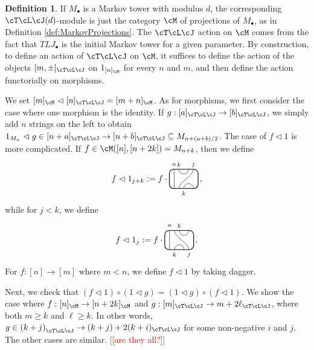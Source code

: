 \documentclass[11pt]{article}
\theoremstyle{plain}
\theoremstyle{definition}
\newtheorem{defn}[thm]{Definition}
\newcommand{\nn}[1]{\textcolor{red}{[[#1]]}}
\newcommand{\TLJ}{\cT\cL\cJ}
\newcommand{\TLPlusPIso}[3]{
 \TLTStart
 \TLTThrough{#1}
 \TLTSnakeR{#2}{#3}
 \TLTEnd
}
\newcommand{\TLMinusPIso}[3]{
 \TLTStart
 \TLTThrough{#1}
 \TLTSnakeL{#2}{#3}
 \TLTEnd
}
\newcommand{\TLTCalcLabelOffset}[3][0cm]{
 \settowidth{#2}{\scriptsize{$#3$}}
 \setlength{#2}{.5#2}
 \setlength{#2}{\maxof{#2}{#1}}
}
\newcommand{\TLTEnd}{
 \draw[thick, rounded corners = 5pt] (0,0) rectangle ($ (TLTlead) + (0,.8) $);
 \end{tikzpicture}
}
\newcommand{\TLTStart}{
 \begin{tikzpicture}[baseline=.3cm]
 \coordinate (TLTlead) at (.2,0); %
 \let\TLTlabelwidth\relax
 \newlength{\TLTlabelwidth}
}
\newcommand{\TLTThrough}[1]{
 \TLTCalcLabelOffset[.2cm]{\TLTlabelwidth}{#1}
 \coordinate (TLTlead) at ($ (TLTlead) + ({\TLTlabelwidth},0) $);
 \begin{scope}[shift=(TLTlead)]
  \draw (0,0) -- (0,.8);
  \node at (0,1) {\scriptsize{$#1$}};
 \end{scope}
  \coordinate (TLTlead) at ($ (TLTlead) + ({\TLTlabelwidth},0) $);
}
\newcommand{\TLTSnakeR}[2]{
 \let\TLTscwidth\relax
 \newlength{\TLTscwidth}
 \let\TLTsswidth\relax
 \newlength{\TLTsswidth}
 \TLTCalcLabelOffset[.2cm]{\TLTscwidth}{#1}
 \TLTCalcLabelOffset[.5cm]{\TLTsswidth}{#2}
 \setlength{\TLTlabelwidth}{\TLTscwidth+\TLTsswidth}
 \setlength{\TLTlabelwidth}{\maxof{\TLTlabelwidth}{.7cm}} %
 \coordinate (TLTlead) at ($ (TLTlead) + ({\TLTscwidth},0) $);
 \begin{scope}[shift=(TLTlead)]
  \draw (.1,.8) arc (-180:0:.2cm);
  \draw (.1,0) .. controls ++(90:.3cm) and ++(270:.3cm) .. ($ (.1,.8) + ({\TLTlabelwidth},0) $);
  \draw ($ (.1,0) + ({\TLTsswidth},0) $) arc (180:0:.2cm);
  \node at (.1,1) {\scriptsize{$#1$}};
  \node at ($ (.1,1) + ({\TLTlabelwidth},0) $) {\scriptsize{$#2$}};
  \node at ($ (.1,-.2) + ({\TLTsswidth},0) $) {\scriptsize{$#1$}};
 \end{scope}
 \coordinate (TLTlead) at ($ (TLTlead) + ({\TLTlabelwidth+\TLTsswidth},0) $);
}
\newcommand{\TLTSnakeL}[2]{
 \let\TLTscwidth\relax
 \newlength{\TLTscwidth}
 \let\TLTsswidth\relax
 \newlength{\TLTsswidth}
 \TLTCalcLabelOffset[.2cm]{\TLTscwidth}{#1}
 \TLTCalcLabelOffset[.1cm]{\TLTsswidth}{#2}
 \setlength{\TLTlabelwidth}{\TLTscwidth+\TLTsswidth}
 \setlength{\TLTlabelwidth}{\maxof{\TLTlabelwidth}{.5cm}} %
 \coordinate (TLTlead) at ($ (TLTlead) + ({\TLTsswidth},0) $);
 \begin{scope}[shift=(TLTlead)]
  \draw ($ (.1,.8) + ({\TLTsswidth+\TLTscwidth},0) $) arc (-180:0:.2cm);
  \draw ($ (.1,0) + ({\TLTlabelwidth},0) $) .. controls ++(90:.3cm) and ++(270:.3cm) .. (.1,.8);
  \draw (.1,0) arc (180:0:.2cm);
  \node at ($ (.1,1) + ({\TLTsswidth+\TLTscwidth},0) $) {\scriptsize{$#1$}};
  \node at (.1,1) {\scriptsize{$#2$}};
  \node at (.1,-.2) {\scriptsize{$#1$}};
 \end{scope}
 \setlength{\TLTscwidth}{\maxof{\TLTscwidth}{.5cm}} %
 \coordinate (TLTlead) at ($ (TLTlead) + ({\TLTlabelwidth+\TLTscwidth},0) $);
}
\begin{document}
\begin{defn}
\label{def:ModuleFromMarkovTower}
 If $M_\bullet$ is a Markov tower with modulus $d$, the corresponding $\cT\cL\cJ(d)$-module is just the category $\cM$ of projections of $M_\bullet$, as in Definition \ref{def:MarkovProjections}.  
The $\TLJ$ action on $\cM$ comes from the fact that $TLJ_\bullet$ is the initial Markov tower for a given parameter. %
By construction, to define an action of $\TLJ$ on $\cM$, it suffices to define the action of the objects $[m,\pm]_{\cT\cL\cJ}$ on $1_{[n]_\cM}$ for every $n$ and $m$, and then define the action functorially on morphisms. 
 
We set $[m]_\cM\vartriangleleft [n]_{\TLJ}=[m+n]_\cM$. 
As for morphisms, we first consider the case where one morphism is the identity. 
 If $g:[a]_{\TLJ}\to[b]_{\TLJ}$, we simply add $n$ strings on the left to obtain $1_{M_n}\vartriangleleft g\in[n+a]_{\TLJ}\to[n+b]_{\TLJ}\subseteq M_{n+(a+b)/2}$. %
 The case of $f\vartriangleleft 1$ is more complicated. If $f\in \cM([n],[n+2k])=M_{n+k}$, then we define 
\[f\vartriangleleft 1_{j+k}
:=
f\cdot
 \begin{tikzpicture}[baseline=.3cm]
  \draw (.2,0) -- (.2,.8);
  \node at (.2,1) {\scriptsize{$n$}};
  \draw (.6,0) arc (180:0:.2cm);
  \node at (.6,-.2) {\scriptsize{$k$}};
  \draw (.4,0) .. controls ++(90:.3cm) and ++(270:.3cm) .. (1,.8);
  \node at (1,1) {\scriptsize{$j$}};
  \draw (.4,.8) arc (-180:0:.2cm);
  \node at (.4,1) {\scriptsize{$k$}};
  \draw[thick, rounded corners = 5pt] (0,0) rectangle (1.2,.8);
 \end{tikzpicture}
 \,\text{,}\]
while for $j<k$, we define 
\[f\vartriangleleft 1_j
:=
f\cdot
 \begin{tikzpicture}[baseline=.3cm]
  \draw (.2,0) -- (.2,.8);
  \node at (.2,1) {\scriptsize{$n$}};
  \draw (.4,0) arc (180:0:.2cm);
  \node at (.4,-.2) {\scriptsize{$k$}};
  \draw (1,0) .. controls ++(90:.3cm) and ++(270:.3cm) .. (.4,.8);
  \node at (1,-.2) {\scriptsize{$j$}};
  \draw (.6,.8) arc (-180:0:.2cm);
  \node at (.6,1) {\scriptsize{$k$}};
  \draw[thick, rounded corners = 5pt] (0,0) rectangle (1.2,.8);
 \end{tikzpicture}
\, \text{.}\]
For $f:[n]\to[m]$ where $m<n$, we define $f\vartriangleleft 1$ by taking dagger. 

 
 Next, we check that $(f\vartriangleleft1)\circ(1\vartriangleleft g)=(1\vartriangleleft g)\circ(f\vartriangleleft1)$. 
 We show the case where $f:[n]_{\cM}\to[n+2k]_{\cM}$ and $g:[m]_{\TLJ}\to{m+2\ell}_{\TLJ}$, where both $m\ge k$ and $\ell\ge k$. In other words, $g\in{(k+j)}_{\TLJ}\to(k+j)+2(k+i)_{\TLJ}$ for some non-negative $i$ and $j$. The other cases are similar. \nn{are they all?}
 

\end{defn}
\end{document}
